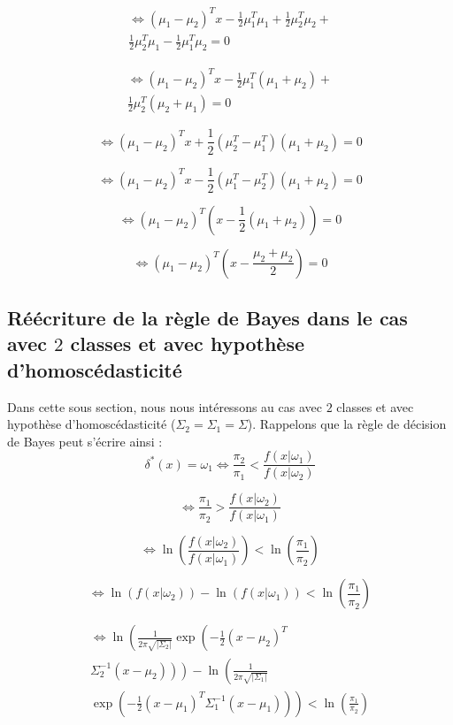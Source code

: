 \documentclass{article}
\begin{document}
\begin{multicols}{2}
\[
\begin{split}
\iff (\mu_1- \mu_2)^T x - \frac{1}{2}\mu_1^T \mu_1 + \frac{1}{2}\mu_2^T \mu_2 + \\
\frac{1}{2}\mu_2^T \mu_1 - \frac{1}{2}\mu_1^T \mu_2 = 0
\end{split}
\]

\[
\begin{split}
\iff (\mu_1- \mu_2)^T x - \frac{1}{2}\mu_1^T (\mu_1 + \mu_2) + \\
\frac{1}{2}\mu_2^T (\mu_2 + \mu_1) = 0
\end{split}
\]

\[
\iff (\mu_1- \mu_2)^T x + \frac{1}{2} (\mu_2^T - \mu_1^T) (\mu_1 + \mu_2) = 0
\]

\[
\iff (\mu_1- \mu_2)^T x - \frac{1}{2} (\mu_1^T - \mu_2^T ) (\mu_1 + \mu_2) = 0
\]

\[
\iff (\mu_1- \mu_2)^T \left(x - \frac{1}{2}(\mu_1 + \mu_2) \right) = 0
\]

\[
\iff (\mu_1- \mu_2)^T \left(x - \frac{\mu_2 + \mu_2}{2} \right) = 0
\]

\subsection{Réécriture de la règle de Bayes dans le cas avec $2$ classes et avec hypothèse d'homoscédasticité}
\label{app_reecriture_bayes}
Dans cette sous section, nous nous intéressons au cas avec $2$ classes et avec hypothèse d'homoscédasticité ($\Sigma_2 = \Sigma_1 = \Sigma$). Rappelons que la règle de décision de Bayes peut s'écrire ainsi :
\[
\delta^{\ast}(x) = \omega_1 \iff 
\frac{\pi_2}{\pi_1} < \frac{f(x|\omega_1)}{f(x|\omega_2)}
\]

\[
\iff 
\frac{\pi_1}{\pi_2} > \frac{f(x|\omega_2)}{f(x|\omega_1)}
\]

\[
\iff 
\ln \left( \frac{f(x|\omega_2)}{f(x|\omega_1)} \right) < \ln \left(\frac{\pi_1}{\pi_2} \right)
\]

\[
\iff 
\ln ( f(x|\omega_2) ) - \ln ( {f(x|\omega_1)} ) < \ln \left(\frac{\pi_1}{\pi_2} \right)
\]

\[
\begin{split}
\iff 
\ln \left( \frac{1}{2 \pi \sqrt{|\Sigma_2|}} \exp \left(-\frac{1}{2}(x - \mu_2)^T \right. \right. \\
\left. \left. \Sigma_2^{-1} (x - \mu_2) \right)  \right) - \ln \left( \frac{1}{2 \pi \sqrt{|\Sigma_1|}} \right. \\
\left. \exp \left(-\frac{1}{2}(x - \mu_1)^T \Sigma_1^{-1} (x - \mu_1) \right)  \right) < \ln \left(\frac{\pi_1}{\pi_2} \right)
\end{split}
\]


\end{multicols}
\end{document}
